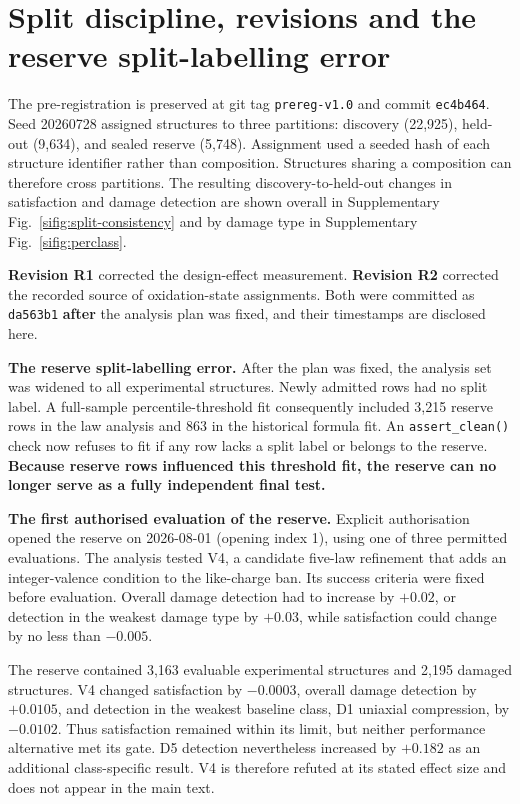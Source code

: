 \section{Split discipline, revisions and the reserve split-labelling error}\label{note:s8}

The pre-registration is preserved at git tag \texttt{prereg-v1.0} and commit
\texttt{ec4b464}. Seed 20260728 assigned structures to three partitions:
discovery (22,925), held-out (9,634), and sealed reserve (5,748). Assignment used
a seeded hash of each structure identifier rather than composition. Structures
sharing a composition can therefore cross partitions.
The resulting discovery-to-held-out changes in satisfaction and damage detection are
shown overall in Supplementary Fig.~\ref{sifig:split-consistency} and by damage type in
Supplementary Fig.~\ref{sifig:perclass}.

\textbf{Revision R1} corrected the design-effect measurement. \textbf{Revision
R2} corrected the recorded source of oxidation-state assignments. Both were
committed as \texttt{da563b1} \textbf{after} the analysis plan was fixed, and
their timestamps are disclosed here.

\textbf{The reserve split-labelling error.} After the plan was fixed, the
analysis set was widened to all experimental structures. Newly admitted rows had
no split label. A full-sample percentile-threshold fit consequently included
3,215 reserve rows in the law analysis and 863 in the historical formula fit.
An \texttt{assert\_clean()} check now refuses to fit if any row lacks a split label
or belongs to the reserve. \textbf{Because reserve rows influenced this
threshold fit, the reserve can no longer serve as a fully independent final
test.}

\textbf{The first authorised evaluation of the reserve.} Explicit authorisation
opened the reserve on 2026-08-01 (opening index 1), using one of three permitted
evaluations. The analysis tested V4, a candidate five-law refinement that adds
an integer-valence condition to the like-charge ban. Its success criteria were
fixed before evaluation. Overall damage detection had to increase by $+0.02$,
or detection in the weakest damage type by $+0.03$, while satisfaction could
change by no less than $-0.005$.

The reserve contained 3,163 evaluable experimental structures and 2,195 damaged
structures. V4 changed satisfaction by $-0.0003$, overall damage detection by
$+0.0105$, and detection in the weakest baseline class, D1 uniaxial compression, by
$-0.0102$. Thus satisfaction remained within its limit, but neither performance
alternative met its gate. D5 detection nevertheless increased by $+0.182$ as an additional
class-specific result. V4 is therefore refuted at its stated effect size and does not
appear in the main text.

